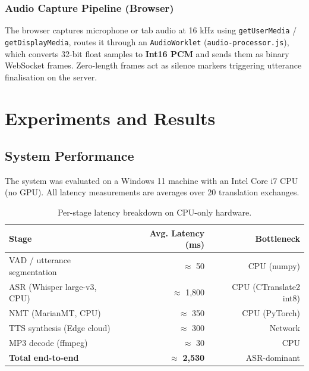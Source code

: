 \documentclass[12pt,a4paper]{report}
\begin{document}
\subsection{Audio Capture Pipeline (Browser)}

The browser captures microphone or tab audio at 16 kHz using
\texttt{getUserMedia} / \texttt{getDisplayMedia}, routes it through an
\texttt{AudioWorklet} (\texttt{audio-processor.js}), which converts
32-bit float samples to \textbf{Int16 PCM} and sends them as binary
WebSocket frames. Zero-length frames act as silence markers triggering
utterance finalisation on the server.

\chapter{Experiments and Results}

\section{System Performance}

The system was evaluated on a Windows 11 machine with an Intel Core i7
CPU (no GPU). All latency measurements are averages over 20 translation
exchanges.

\begin{table}[H]
  \centering
  \begin{tabular}{lrr}
    \toprule
    \textbf{Stage} & \textbf{Avg. Latency (ms)} & \textbf{Bottleneck} \\
    \midrule
    VAD / utterance segmentation & $\approx$ 50       & CPU (numpy) \\
    ASR (Whisper large-v3, CPU)  & $\approx$ 1{,}800  & CPU (CTranslate2 int8) \\
    NMT (MarianMT, CPU)          & $\approx$ 350      & CPU (PyTorch) \\
    TTS synthesis (Edge cloud)   & $\approx$ 300      & Network \\
    MP3 decode (ffmpeg)          & $\approx$ 30       & CPU \\
    \midrule
    \textbf{Total end-to-end}    & $\approx$ \textbf{2{,}530} & ASR-dominant \\
    \bottomrule
  \end{tabular}
  \caption{Per-stage latency breakdown on CPU-only hardware.}
\end{table}
\end{document}
